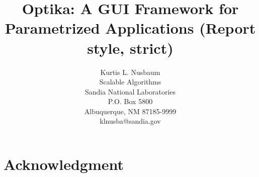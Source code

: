 \documentclass[pdf,ps2pdf,12pt,report,strict,blank]{SANDreport}
\title{Optika: A GUI Framework for Parametrized Applications (Report style, strict)}
\author{Kurtis L. Nusbaum \\
	  Scalable Algorithms \\
	  Sandia National Laboratories\\
	  P.O. Box 5800\\
	  Albuquerque, NM 87185-9999 \\
	  klnusba@sandia.gov \\
	 }
\date{}
\begin{document}
    \maketitle

    \begin{abstract}
	
    \end{abstract}


    \clearpage
    \chapter*{Acknowledgment}
	


    \cleardoublepage		%
    \tableofcontents
    \listoffigures
    \listoftables






    \clearpage
\end{document}
